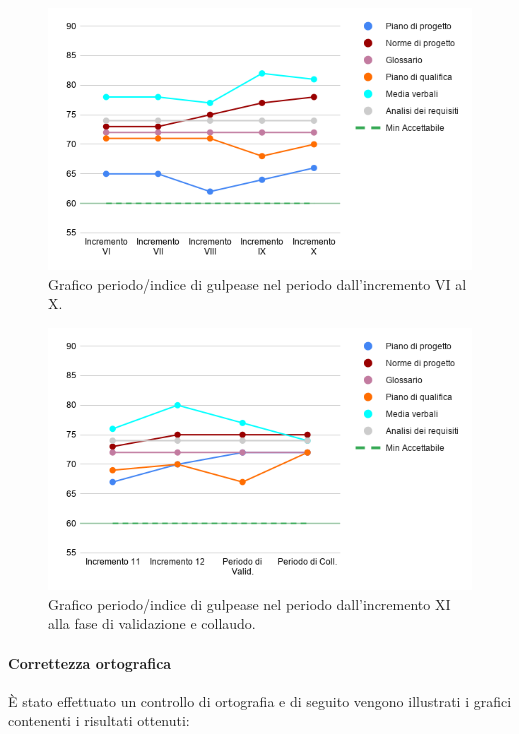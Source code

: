 \begin{figure}[H]
	\centering
	\includegraphics[width=0.8\linewidth]{./res/images/gulpease_3.png}
	\caption{Grafico periodo/indice di gulpease nel periodo dall'incremento VI al X.}
	\label{fig:Grafico indice di gulpease periodo dall'incremento VI al X.}
\end{figure}
\begin{figure}[H]
	\centering
	\includegraphics[width=0.8\linewidth]{./res/images/gulpease_4.png}
	\caption{Grafico periodo/indice di gulpease nel periodo dall'incremento XI alla fase di validazione e collaudo.}
	\label{fig:Grafico indice di gulpease periodo dall'incremento XI alla fase di validazione e collaudo.}
\end{figure}

\paragraph{Correttezza ortografica}
È stato effettuato un controllo di ortografia e di seguito vengono illustrati i grafici contenenti i risultati ottenuti:

